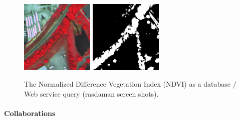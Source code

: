 \begin{figure}[ht]
  \begin{center}
     \includegraphics[width=3.5cm]{ndvi-1.jpg}
     \includegraphics[width=3.5cm]{ndvi-2.jpg}
    \caption{The Normalized Difference Vegetation Index (NDVI) as a database / Web
      service query (rasdaman screen shots).}\label{fig:ndvi}
   \end{center}
\end{figure}

\paragraph{Collaborations}

